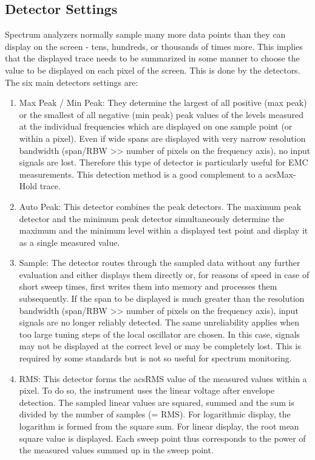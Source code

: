 \subsection{Detector Settings}
Spectrum analyzers normally sample many more data points than they can display on the screen - tens, hundreds, or thousands of times more. This implies that the displayed trace needs to be summarized in some manner to choose the value to be displayed on each pixel of the screen. This is done by the detectors. The six main detectors settings are:
\begin{enumerate}
  \item Max Peak / Min Peak: They determine the largest of all positive (max peak) or the smallest of all negative (min peak) peak values of the levels measured at the individual frequencies which are displayed on one sample point (or within a pixel). Even if wide spans are displayed with very narrow resolution bandwidth (span/\acs{RBW} >> number of pixels on the frequency axis), no input signals are lost. Therefore this type of detector is particularly useful for \acs{EMC} measurements. This detection method is a good complement to a acs{Max-Hold} trace.
  \item Auto Peak: This detector combines the peak detectors. The maximum peak detector and the minimum peak detector simultaneously determine the maximum and the minimum level within a displayed test point and display it as a single measured value. 
  \item Sample: The detector routes through the sampled data without any further evaluation and either displays them directly or, for reasons of speed in case of short sweep times, first writes them into memory and processes them subsequently. If the span to be displayed is much greater than the resolution bandwidth (span/\acs{RBW} >> number of pixels on the frequency axis), input signals are no longer reliably detected. The same unreliability applies when too large tuning steps of the local oscillator are chosen. In this case, signals may not be displayed at the correct level or may be completely lost. This is required by some standards but is not so useful for spectrum monitoring. 
  \item \ac{RMS}: This detector forms the acs{RMS} value of the measured values within a pixel. To do so, the instrument uses the linear voltage after envelope detection. The sampled linear values are squared, summed and the sum is divided by the number of samples (= \acs{RMS}). For logarithmic display, the logarithm is formed from the square sum. For linear display, the root mean square value is displayed. Each sweep point thus corresponds to the power of the measured values summed up in the sweep point. 

\end{enumerate}
